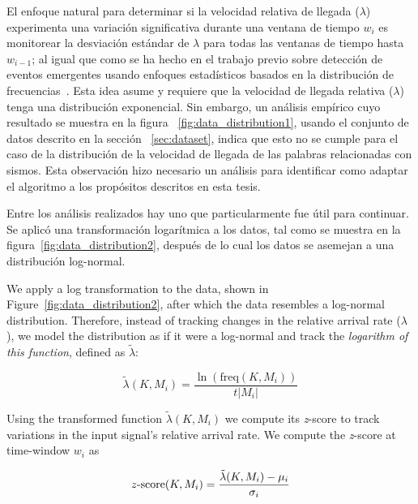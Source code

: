 El enfoque natural para determinar si la velocidad relativa de llegada ($\lambda$) experimenta una variación significativa durante una ventana de tiempo $w_i$ es monitorear la desviación estándar de $\lambda$ para todas las ventanas de tiempo hasta $w_{i-1}$; al igual que como se ha hecho en el trabajo previo sobre detección de eventos emergentes usando enfoques estadísticos basados en la distribución de frecuencias~\cite{kleinberg2003bursty, mathioudakis2010twittermonitor,
nguyen2013event}.
%
Esta idea asume y requiere que la velocidad de llegada relativa ($\lambda$) tenga una distribución exponencial. 
%
Sin embargo, un análisis empírico cuyo resultado se muestra en la figura ~\ref{fig:data_distribution1}, usando el conjunto de datos descrito en la sección ~\ref{sec:dataset}, indica que esto no se cumple para el caso de la distribución de la velocidad de llegada de las palabras relacionadas con sismos.
%
Esta observación hizo necesario un análisis para identificar como adaptar el algoritmo a los propósitos descritos en esta tesis.

Entre los análisis realizados hay uno que particularmente fue útil para continuar. Se aplicó una transformación logarítmica a los datos, tal como se muestra en la figura~\ref{fig:data_distribution2}, después de lo cual los datos se asemejan a una distribución log-normal.
 
We apply a log transformation to the data, shown in
Figure~\ref{fig:data_distribution2}, after which the data resembles a
log-normal distribution. 
%
% 
%
Therefore, instead of tracking changes in the relative arrival rate
($\lambda$), we model the distribution as if it were a log-normal and track the {\em logarithm of this function},
defined as $\tilde{\lambda}$:

\begin{equation}
\label{eq:log_lambda}
\tilde{\lambda}(K, M_i) = \frac{\ln\left(\mathrm{freq}(K,M_i)\right)}{t |M_i|}
\end{equation}

Using the transformed function $\tilde{\lambda}(K, M_i)$ we compute its {\em z}-score to track variations in the input signal's relative arrival rate.  We compute the {\em z}-score at time-window $w_i$ as

\newcommand{\zscore}{\ensuremath{z\textnormal{-}\mathrm{score}}}
\begin{equation}
\label{eq:zscore}
\zscore(K, M_i) = \frac{\tilde{\lambda}(K, M_i)-\mu_i}{\sigma_i}
\end{equation}

